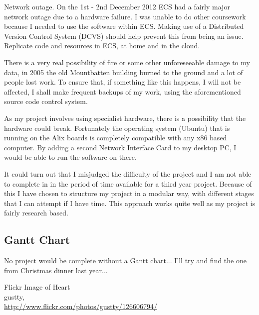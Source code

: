 \documentclass[12pt]{report}
\begin{document}
Network outage. On the 1st - 2nd December 2012 ECS had a fairly major network
outage due to a hardware failure. I was unable to do other coursework because I
needed to use the software within ECS. Making use of a Distributed Version
Control System (DCVS) should help prevent this from being an issue. Replicate
code and resources in ECS, at home and in the cloud. 

There is a very real possibility of fire or some other unforeseeable damage to my
data, in 2005 the old Mountbatten building burned to the ground and a lot of
people lost work. To ensure that, if something like this happens, I will not be
affected, I shall make frequent backups of my work, using the aforementioned
source code control system.

As my project involves using specialist hardware, there is a possibility that
the hardware could break. Fortunately the operating system (Ubuntu) that is running on
the Alix boards is completely compatible with any x86 based computer. By adding
a second Network Interface Card to my desktop PC, I would be able to run the
software on there. 

It could turn out that I misjudged the difficulty of the project and I am not
able to complete in in the period of time available for a third year project.
Because of this I have chosen to structure my project in a modular way, with
different stages that I can attempt if I have time. This approach works quite
well as my project is fairly research based. 

\pagebreak

\begin{landscape}

\section{Gantt Chart}
No project would be complete without a Gantt chart... I'll try and find the one
from Christmas dinner last year...

\end{landscape}

\pagebreak


\begin{thebibliography}{9}


	Flickr Image of Heart \\
	gustty,\\
	\url{http://www.flickr.com/photos/gustty/126606794/}


\end{thebibliography}
\end{document}
